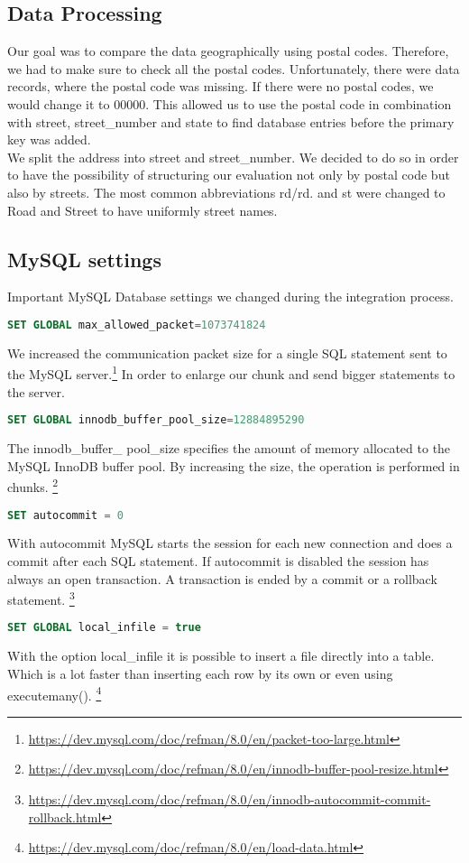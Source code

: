 \subsection*{Data Processing}
Our goal was to compare the data geographically using postal codes. Therefore, we had to make sure to check all the postal codes. Unfortunately, there were data records, where the postal code was missing. If there were no postal codes, we would change it to 00000. This allowed us to use the postal code in combination with street, street\_number and state to find database entries before the primary key was added.\\
We split the address into street and street\_number. We decided to do so in order to have the possibility of structuring our evaluation not only by postal code but also by streets. The most common abbreviations rd\//rd. and st were changed to Road and Street to have uniformly street names.

\subsection*{MySQL settings}
Important MySQL Database settings we changed during the integration process.
\begin{lstlisting}[language=SQL]
    SET GLOBAL max_allowed_packet=1073741824 
\end{lstlisting}
We increased the communication packet size for a single SQL statement sent to the MySQL server.\footnote{\url{https://dev.mysql.com/doc/refman/8.0/en/packet-too-large.html}} In order to enlarge our chunk and send bigger statements to the server.
\begin{lstlisting}[language=SQL]
    SET GLOBAL innodb_buffer_pool_size=12884895290 
\end{lstlisting}
The innodb\_buffer\_ pool\_size specifies the amount of memory allocated to the MySQL InnoDB buffer pool. By increasing the size, the operation is performed in chunks. \footnote{\url{https://dev.mysql.com/doc/refman/8.0/en/innodb-buffer-pool-resize.html}}
\begin{lstlisting}[language=SQL]
    SET autocommit = 0
\end{lstlisting}
With autocommit MySQL starts the session for each new connection and does a commit after each SQL statement. If autocommit is disabled the session has always an open transaction. A transaction is ended by a commit or a rollback statement. \footnote{\url{https://dev.mysql.com/doc/refman/8.0/en/innodb-autocommit-commit-rollback.html}}
\begin{lstlisting}[language=SQL]
    SET GLOBAL local_infile = true
\end{lstlisting}
With the option local\_infile it is possible to insert a file directly into a table. Which is a lot faster than inserting each row by its own or even using executemany(). \footnote{\url{https://dev.mysql.com/doc/refman/8.0/en/load-data.html}}

